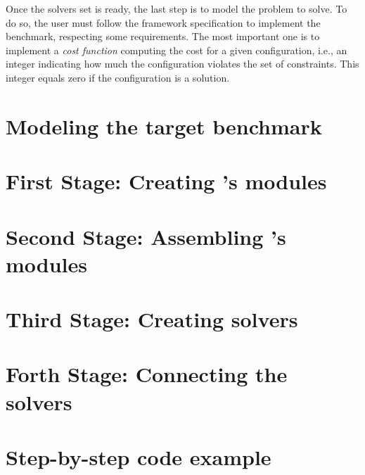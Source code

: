 Once the solvers set is ready, the last step is to model the problem to solve. To do so, the user must follow the framework specification to implement the benchmark, respecting some requirements. The most important one is to implement a {\it cost function} computing the cost for a given configuration, i.e., an integer indicating how much the configuration violates the set of constraints. This integer equals zero if the configuration is a solution.

\section{Modeling the target benchmark}
\label{sec:model}



\section{First Stage: Creating \posl's modules}
\label{sec:1ststage}



\section{Second Stage: Assembling \posl's modules}
\label{sec:2ndstage}



\section{Third Stage: Creating \posl{} solvers}
\label{sec:3rdstage}



\section{Forth Stage: Connecting the solvers}
\label{sec:4thstage}



\section{Step-by-step \posl{} code example}

